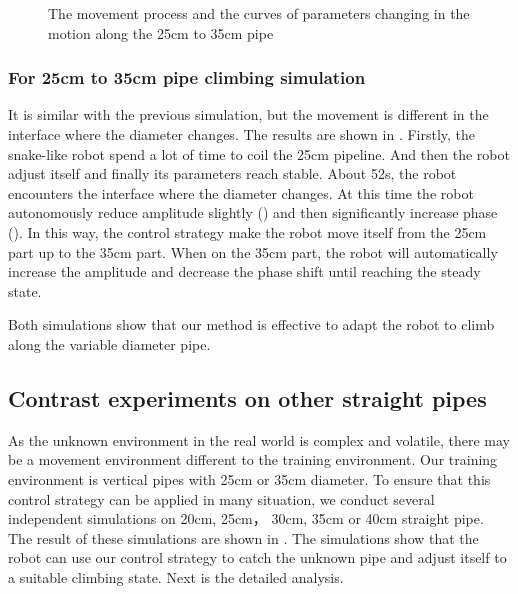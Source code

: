 \begin{figure}[!t]
	\caption{The movement process and the curves of parameters changing in the motion along the 25cm to 35cm pipe}
\end{figure}

\subsubsection{For 25cm to 35cm pipe climbing simulation}
It is similar with the previous simulation, but the movement is different in the interface where the diameter changes. The results are shown in . Firstly, the snake-like robot spend a lot of time to coil the 25cm pipeline. And then the robot adjust itself and finally its parameters reach stable. About 52s, the robot encounters the interface where the diameter changes. At this time the robot autonomously reduce amplitude slightly () and then significantly increase  phase (). In this way, the control strategy make the robot move itself from the 25cm part up to the 35cm part. When on the 35cm part, the robot will automatically increase the amplitude and decrease the phase shift until reaching the steady state.

Both simulations show that our method is effective to adapt the robot to climb along the variable diameter pipe.

\subsection{Contrast experiments on other straight pipes}

As the unknown environment in the real world is complex and volatile, there may be a movement environment different to the training environment. Our training environment is vertical pipes with 25cm or 35cm diameter. To ensure that this control strategy can be applied in many situation, we conduct several  independent simulations on 20cm, 25cm， 30cm, 35cm or 40cm straight pipe. The result of these simulations are shown in . The simulations show that the robot can use our control strategy to catch the unknown pipe and adjust itself to a suitable climbing state. Next is the detailed analysis.

